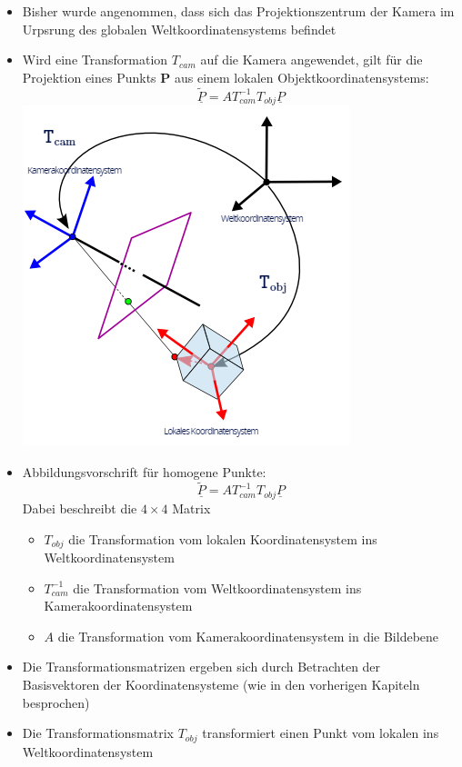 \documentclass{scrartcl}
\begin{document}
\begin{itemize}
	\item Bisher wurde angenommen, dass sich das Projektionszentrum der Kamera im Urpsrung des globalen Weltkoordinatensystems befindet
	\item Wird eine Transformation $T_{cam}$ auf die Kamera angewendet, gilt für die Projektion eines Punkts \textbf{P} aus einem lokalen Objektkoordinatensystems:
	\begin{equation}
		\underline{\widetilde{P}} = AT_{cam}^{-1} T_{obj} \underline{P}
	\end{equation}
	\includegraphics[scale=0.5]{figures/local2cam1.png}
	\item Abbildungsvorschrift für homogene Punkte:
	\begin{equation}
		\underline{\widetilde{P}} = AT_{cam}^{-1} T_{obj} \underline{P}
	\end{equation}
	Dabei beschreibt die $4 \times 4$ Matrix
	\begin{itemize}
		\item $T_{obj}$ die Transformation vom lokalen Koordinatensystem ins Weltkoordinatensystem
		\item $T_{cam}^{-1}$ die Transformation vom Weltkoordinatensystem ins Kamerakoordinatensystem
		\item $A$ die Transformation vom Kamerakoordinatensystem in die Bildebene
	\end{itemize}
	\item Die Transformationsmatrizen ergeben sich durch Betrachten der Basisvektoren der Koordinatensysteme (wie in den vorherigen Kapiteln besprochen)
	\item Die Transformationsmatrix $T_{obj}$ transformiert einen Punkt vom lokalen ins Weltkoordinatensystem

\end{itemize}
\end{document}
